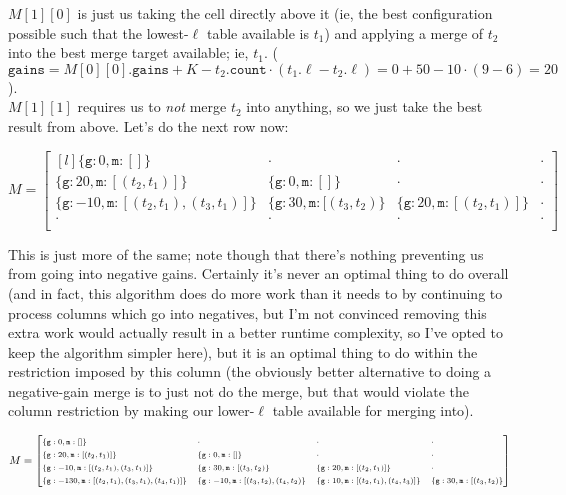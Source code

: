 \documentclass{article}[12]
\begin{document}
$M[1][0]$ is just us taking the cell directly above it (ie, the best configuration possible such that the lowest-$\ell$ table available is $t_1$) and applying a merge of $t_2$ into the best merge target available; ie, $t_1$. ($\texttt{gains} = M[0][0].\texttt{gains} + K - t_2.\texttt{count} \cdot (t_1.\ell - t_2.\ell) = 0 + 50 - 10 \cdot (9 - 6) = 20$).\\

$M[1][1]$ requires us to \textit{not} merge $t_2$ into anything, so we just take the best result from above. Let's do the next row now:

\[ M = \begin{bmatrix*}[l]
\{ \texttt{g}: 0, \texttt{m}: []\} & \cdot & \cdot & \cdot\\
\{ \texttt{g}: 20, \texttt{m}: [(t_2, t_1)]\} & \{ \texttt{g}: 0, \texttt{m}: []\} & \cdot & \cdot\\
\{ \texttt{g}: -10, \texttt{m}: [(t_2, t_1), (t_3, t_1)]\} & \{ \texttt{g}: 30, \texttt{m}: [(t_3, t_2)\} & \{ \texttt{g}: 20, \texttt{m}: [(t_2, t_1)]\} & \cdot\\
\cdot & \cdot & \cdot & \cdot\\
\end{bmatrix*} \]

This is just more of the same; note though that there's nothing preventing us from going into negative gains. Certainly it's never an optimal thing to do overall (and in fact, this algorithm does do more work than it needs to by continuing to process columns which go into negatives, but I'm not convinced removing this extra work would actually result in a better runtime complexity, so I've opted to keep the algorithm simpler here), but it is an optimal thing to do within the restriction imposed by this column (the obviously better alternative to doing a negative-gain merge is to just not do the merge, but that would violate the column restriction by making our lower-$\ell$ table available for merging into).

\[ M = \fontsize{7}{8}\begin{bmatrix*}[l] 
\{ \texttt{g}: 0, \texttt{m}: []\} & \cdot & \cdot & \cdot\\
\{ \texttt{g}: 20, \texttt{m}: [(t_2, t_1)]\} & \{ \texttt{g}: 0, \texttt{m}: []\} & \cdot & \cdot\\
\{ \texttt{g}: -10, \texttt{m}: [(t_2, t_1), (t_3, t_1)]\} & \{ \texttt{g}: 30, \texttt{m}: [(t_3, t_2)\} & \{ \texttt{g}: 20, \texttt{m}: [(t_2, t_1)]\} & \cdot\\
\{ \texttt{g}: -130, \texttt{m}: [(t_2, t_1), (t_3, t_1), (t_4, t_1)]\} & \{ \texttt{g}: -10, \texttt{m}: [(t_3, t_2), (t_4, t_2)\} & \{ \texttt{g}: 10, \texttt{m}: [(t_2, t_1), (t_4, t_3)]\} & \{ \texttt{g}: 30, \texttt{m}: [(t_3, t_2)\} \\
\end{bmatrix*} \]
\end{document}

